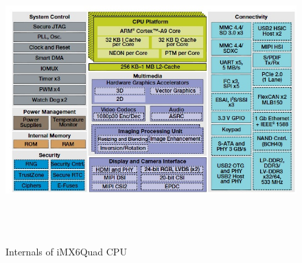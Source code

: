 \begin{figure}[h!]
	\centering
	\includegraphics[width=160mm, height=110mm]{figures/imx6q}
	\caption{Internals of iMX6Quad CPU \cite{imx_spec}}
	\label{fig:app:imx6q}
\end{figure}


\cleardoublepage
